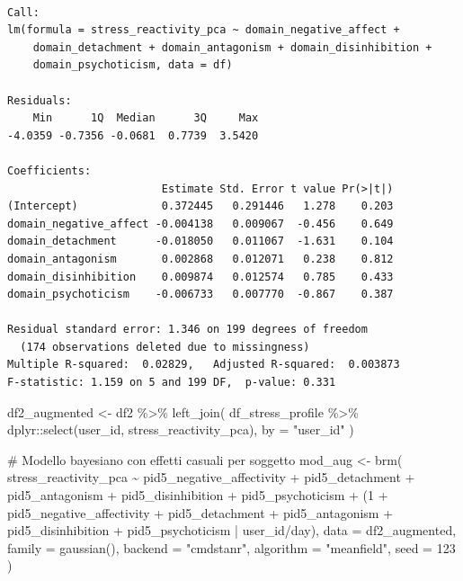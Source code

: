 \documentclass[
  11pt,
  a4paper,
  onecolumn]{article}
\newenvironment{Shaded}{}{}
\newcommand{\AttributeTok}[1]{\textcolor[rgb]{0.84,0.23,0.29}{#1}}
\newcommand{\CommentTok}[1]{\textcolor[rgb]{0.42,0.45,0.49}{#1}}
\newcommand{\DecValTok}[1]{\textcolor[rgb]{0.00,0.36,0.77}{#1}}
\newcommand{\FunctionTok}[1]{\textcolor[rgb]{0.44,0.26,0.76}{#1}}
\newcommand{\NormalTok}[1]{\textcolor[rgb]{0.14,0.16,0.18}{#1}}
\newcommand{\OtherTok}[1]{\textcolor[rgb]{0.44,0.26,0.76}{#1}}
\newcommand{\SpecialCharTok}[1]{\textcolor[rgb]{0.00,0.36,0.77}{#1}}
\newcommand{\StringTok}[1]{\textcolor[rgb]{0.01,0.18,0.38}{#1}}
\begin{document}
\begin{verbatim}

Call:
lm(formula = stress_reactivity_pca ~ domain_negative_affect + 
    domain_detachment + domain_antagonism + domain_disinhibition + 
    domain_psychoticism, data = df)

Residuals:
    Min      1Q  Median      3Q     Max 
-4.0359 -0.7356 -0.0681  0.7739  3.5420 

Coefficients:
                        Estimate Std. Error t value Pr(>|t|)
(Intercept)             0.372445   0.291446   1.278    0.203
domain_negative_affect -0.004138   0.009067  -0.456    0.649
domain_detachment      -0.018050   0.011067  -1.631    0.104
domain_antagonism       0.002868   0.012071   0.238    0.812
domain_disinhibition    0.009874   0.012574   0.785    0.433
domain_psychoticism    -0.006733   0.007770  -0.867    0.387

Residual standard error: 1.346 on 199 degrees of freedom
  (174 observations deleted due to missingness)
Multiple R-squared:  0.02829,   Adjusted R-squared:  0.003873 
F-statistic: 1.159 on 5 and 199 DF,  p-value: 0.331
\end{verbatim}

\begin{Shaded}
\begin{Highlighting}[]
\NormalTok{df2\_augmented }\OtherTok{\textless{}{-}}\NormalTok{ df2 }\SpecialCharTok{\%\textgreater{}\%}
  \FunctionTok{left\_join}\NormalTok{(}
\NormalTok{    df\_stress\_profile }\SpecialCharTok{\%\textgreater{}\%}\NormalTok{ dplyr}\SpecialCharTok{::}\FunctionTok{select}\NormalTok{(user\_id, stress\_reactivity\_pca),}
    \AttributeTok{by =} \StringTok{"user\_id"}
\NormalTok{  )}
\end{Highlighting}
\end{Shaded}

\begin{Shaded}
\begin{Highlighting}[]
\CommentTok{\# Modello bayesiano con effetti casuali per soggetto}
\NormalTok{mod\_aug }\OtherTok{\textless{}{-}} \FunctionTok{brm}\NormalTok{(}
\NormalTok{  stress\_reactivity\_pca }\SpecialCharTok{\textasciitilde{}}
\NormalTok{    pid5\_negative\_affectivity }\SpecialCharTok{+}\NormalTok{ pid5\_detachment }\SpecialCharTok{+}\NormalTok{ pid5\_antagonism }\SpecialCharTok{+}
\NormalTok{    pid5\_disinhibition }\SpecialCharTok{+}\NormalTok{ pid5\_psychoticism }\SpecialCharTok{+}
\NormalTok{    (}\DecValTok{1} \SpecialCharTok{+}\NormalTok{ pid5\_negative\_affectivity }\SpecialCharTok{+}\NormalTok{ pid5\_detachment }\SpecialCharTok{+}\NormalTok{ pid5\_antagonism }\SpecialCharTok{+}
\NormalTok{       pid5\_disinhibition }\SpecialCharTok{+}\NormalTok{ pid5\_psychoticism }\SpecialCharTok{|}\NormalTok{ user\_id}\SpecialCharTok{/}\NormalTok{day),}
  \AttributeTok{data =}\NormalTok{ df2\_augmented,}
  \AttributeTok{family =} \FunctionTok{gaussian}\NormalTok{(),}
  \AttributeTok{backend =} \StringTok{"cmdstanr"}\NormalTok{,}
  \AttributeTok{algorithm =} \StringTok{"meanfield"}\NormalTok{,}
  \AttributeTok{seed =} \DecValTok{123}
\NormalTok{)}
\end{Highlighting}
\end{Shaded}
\end{document}
